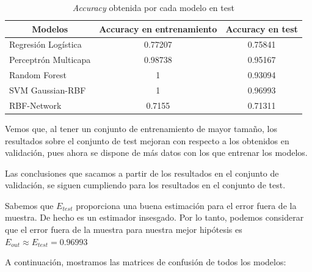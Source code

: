 \documentclass[a4]{article}
\begin{document}
\begin{table}[H]
	\centering
    \begin{tabular}{|l|c|c|}
    \hline
    \multicolumn{1}{|c|}{\textbf{Modelos}} & \multicolumn{1}{l|}{\textbf{Accuracy en entrenamiento}} & \textbf{Accuracy en test} \\ \hline
    Regresión Logística                    & 0.77207                                                 & 0.75841                   \\ \hline
    Perceptrón Multicapa                   & 0.98738                                                 & 0.95167                   \\ \hline
    Random Forest                          & 1                                                       & 0.93094                   \\ \hline
    SVM Gaussian-RBF                       & 1                                                       & 0.96993                   \\ \hline
    RBF-Network                            & 0.7155                                               & 0.71311                  \\ \hline
    \end{tabular}
	\caption{\textit{Accuracy} obtenida por cada modelo en test}
	\label{table:test}
\end{table}

Vemos que, al tener un conjunto de entrenamiento de mayor tamaño, los resultados sobre el conjunto de test mejoran con respecto a los obtenidos en validación, pues ahora se dispone de más datos con los que entrenar los modelos. 

Las conclusiones que sacamos a partir de los resultados en el conjunto de validación, se siguen cumpliendo para los resultados en el conjunto de test. 

Sabemos que $E_{test}$ proporciona una buena estimación para el error fuera de la muestra. De hecho es un estimador
insesgado. Por lo tanto, podemos considerar que el error fuera de la muestra para nuestra mejor hipótesis es  $E_{out}\approx E_{test}=0.96993$


A continuación, mostramos las matrices de confusión de todos los modelos:
\end{document}
